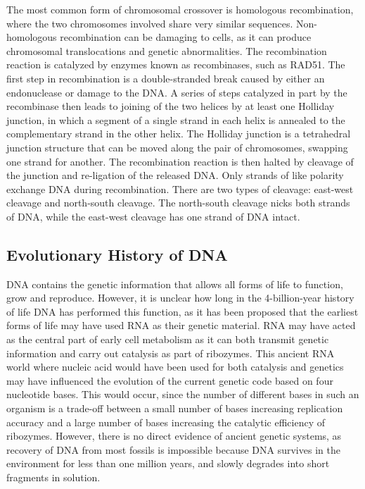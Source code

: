 The most common form of chromosomal crossover is homologous recombination, where the two chromosomes involved share very similar sequences. Non-homologous recombination can be damaging to cells, as it can produce chromosomal translocations and genetic abnormalities. The recombination reaction is catalyzed by enzymes known as recombinases, such as RAD51. The first step in recombination is a double-stranded break caused by either an endonuclease or damage to the DNA. A series of steps catalyzed in part by the recombinase then leads to joining of the two helices by at least one Holliday junction, in which a segment of a single strand in each helix is annealed to the complementary strand in the other helix. The Holliday junction is a tetrahedral junction structure that can be moved along the pair of chromosomes, swapping one strand for another. The recombination reaction is then halted by cleavage of the junction and re-ligation of the released DNA. Only strands of like polarity exchange DNA during recombination. There are two types of cleavage: east-west cleavage and north-south cleavage. The north-south cleavage nicks both strands of DNA, while the east-west cleavage has one strand of DNA intact.

\hypertarget{evolutionary-history-of-dna}{%
\subsection{Evolutionary History of DNA}\label{evolutionary-history-of-dna}}

DNA contains the genetic information that allows all forms of life to function, grow and reproduce. However, it is unclear how long in the 4-billion-year history of life DNA has performed this function, as it has been proposed that the earliest forms of life may have used RNA as their genetic material. RNA may have acted as the central part of early cell metabolism as it can both transmit genetic information and carry out catalysis as part of ribozymes. This ancient RNA world where nucleic acid would have been used for both catalysis and genetics may have influenced the evolution of the current genetic code based on four nucleotide bases. This would occur, since the number of different bases in such an organism is a trade-off between a small number of bases increasing replication accuracy and a large number of bases increasing the catalytic efficiency of ribozymes. However, there is no direct evidence of ancient genetic systems, as recovery of DNA from most fossils is impossible because DNA survives in the environment for less than one million years, and slowly degrades into short fragments in solution.

